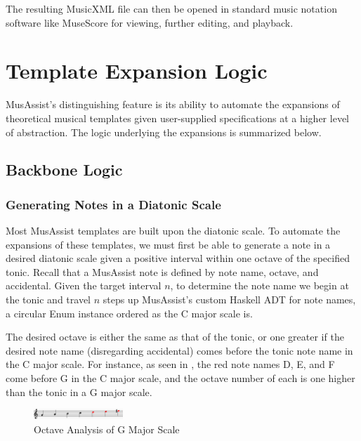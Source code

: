 \documentclass{article}
\begin{document}
The resulting MusicXML file can then be opened in standard music notation software like MuseScore for viewing, further editing, and playback.


\section{Template Expansion Logic}\label{sec:template_expansions}
MusAssist’s distinguishing feature is its ability to automate the expansions of theoretical musical templates given user-supplied specifications at a higher level of abstraction. The logic underlying the expansions is summarized below. 

\subsection{Backbone Logic}
\subsubsection{Generating Notes in a Diatonic Scale}
\label{sec:note_generate}
Most MusAssist templates are built upon the diatonic scale. To automate the expansions of these templates, we must first be able to generate a note in a desired diatonic scale given a positive interval within one octave of the specified tonic. Recall that a MusAssist note is defined by note name, octave, and accidental. Given the target interval $n$, to determine the note name we begin at the tonic and travel $n$ steps up MusAssist’s custom Haskell ADT for note names, a circular Enum instance ordered as the C major scale is. 

The desired octave is either the same as that of the tonic, or one greater if the desired note name (disregarding accidental) comes before the tonic note name in the C major scale. For instance, as seen in , the red note names D, E, and F come before G in the C major scale, and the octave number of each is one higher than the tonic in a G major scale.

\vspace{-2mm}
\begin{figure}[h!]
\centering
\includegraphics[width=0.3\textwidth]{images/note_octave_logic}
\caption{\centering Octave Analysis of G Major Scale}
\label{note_octaves}
\vspace{-3mm}
\end{figure}
\end{document}
